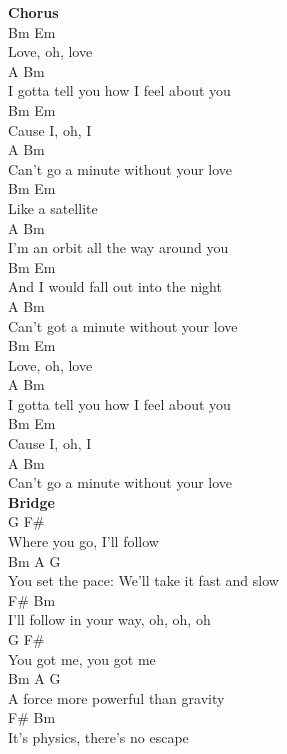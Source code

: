 \documentclass[a4paper]{article}
\begin{document}
{\begin{multicols}
{            }
            \columnbreak
            \textbf{Chorus}
            ~\\
            {
                \cutive
                \obeyspaces
Bm        Em
\\
Love, oh, love
\\
         A                    Bm
\\
I gotta tell you how I feel about you
\\
      Bm     Em
\\
Cause I, oh, I
\\
            A                   Bm
\\
Can't go a minute without your love
\\
 Bm           Em
\\
Like a satellite
\\
       A                   Bm
\\
I'm an orbit all the way around you
\\
             Bm                Em
\\
And I would fall out into the night
\\
             A                  Bm
\\
Can't got a minute without your love
\\
 Bm        Em
\\
Love, oh, love
\\
         A                    Bm
\\
I gotta tell you how I feel about you
\\
      Bm     Em
\\
Cause I, oh, I
\\
            A                   Bm
\\
Can't go a minute without your love
\\

            }
            \textbf{Bridge}
            ~\\
            {
                \cutive
                \obeyspaces
G              F\#
\\
  Where you go,   I'll follow
\\
Bm              A                            G
\\
   You set the pace: We'll take it fast and slow
\\
            F\#      Bm
\\
I'll follow in your way, oh, oh, oh
\\
G            F\#
\\
  You got me,   you got me
\\
Bm               A                  G
\\
   A force more powerful than gravity
\\
             F\#               Bm
\\
It's physics,   there's no escape
\\

}
\end{multicols}}
\end{document}
